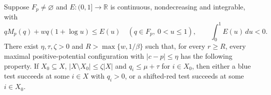 \begin{proposition}\label{prop:local-alternative}
Suppose $F_p\ne\varnothing$ and $E:(0,1]\to\mathbb R$ is continuous,
nondecreasing and integrable, with
\begin{equation}\label{eq:negative-envelope}
 qM_p(q)+wq(1+\log u)\le E(u)
 \quad(q\in F_p,\ 0<u\le1),\qquad
 \int_0^1E(u)\,du<0.
\end{equation}
There exist $\eta,\tau,\zeta>0$ and $R>\max\{w,1/\beta\}$ such that,
for every $r\ge R$, every maximal positive-potential configuration with
$|c-p|\le\eta$ has the following property. If $X_0\subseteq X$,
$|X\setminus X_0|\le\zeta|X|$ and $q_i\le\mu+\tau$ for $i\in X_0$,
then either a blue test succeeds at some $i\in X$ with $q_i>0$, or a
shifted-red test succeeds at some $i\in X_0$.
\end{proposition}
